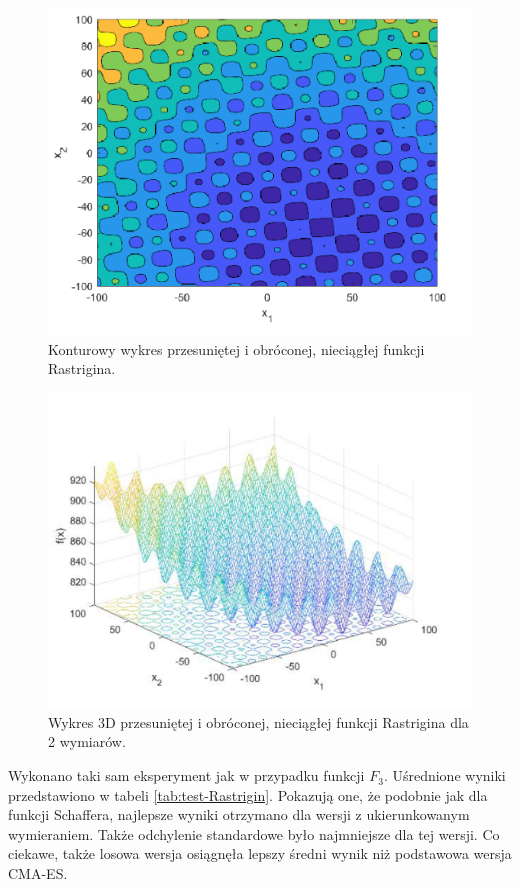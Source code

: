 \documentclass[10pt]{article}
\begin{document}
\begin{figure}[H]
\centering
\includegraphics[scale=1]{images/contour-rastrigin.png}
\caption{Konturowy wykres przesuniętej i obróconej, nieciągłej funkcji Rastrigina.}
\end{figure}
\begin{figure}[H]
\centering
\includegraphics[scale=1]{images/3d-rastrigin.png}
\caption{Wykres 3D przesuniętej i obróconej, nieciągłej funkcji Rastrigina dla 2 wymiarów.}
\end{figure}

Wykonano taki sam eksperyment jak w przypadku funkcji $F_3$. Uśrednione wyniki przedstawiono w tabeli \ref{tab:test-Rastrigin}. Pokazują one, że podobnie jak dla funkcji Schaffera, najlepsze wyniki otrzymano dla wersji z ukierunkowanym wymieraniem. Także odchylenie standardowe było najmniejsze dla tej wersji. Co ciekawe, także losowa wersja osiągnęła lepszy średni wynik niż podstawowa wersja CMA-ES.
\end{document}
